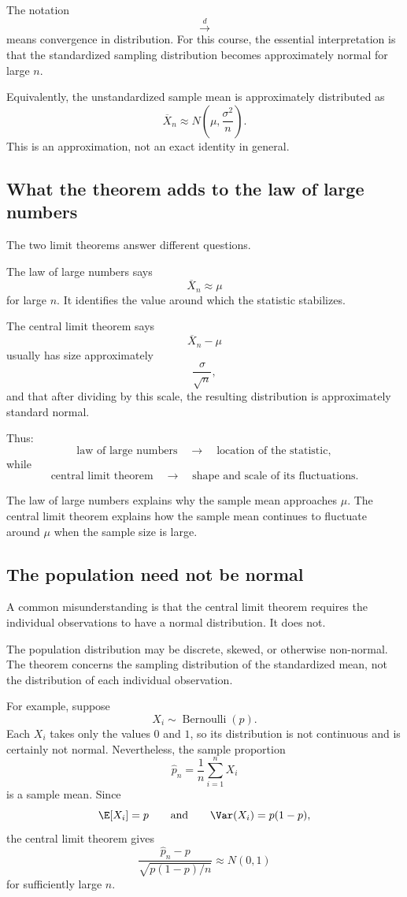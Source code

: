 The notation
\[
\xrightarrow{d}
\]
means convergence in distribution. For this course, the essential interpretation
is that the standardized sampling distribution becomes approximately normal for
large \(n\).

Equivalently, the unstandardized sample mean is approximately distributed as
\[
\overline X_n
\approx
N\left(\mu,\frac{\sigma^2}{n}\right).
\]
This is an approximation, not an exact identity in general.

\subsection*{What the theorem adds to the law of large numbers}

The two limit theorems answer different questions.

The law of large numbers says
\[
\overline X_n\approx\mu
\]
for large \(n\). It identifies the value around which the statistic stabilizes.

The central limit theorem says
\[
\overline X_n-\mu
\]
usually has size approximately
\[
\frac{\sigma}{\sqrt n},
\]
and that after dividing by this scale, the resulting distribution is
approximately standard normal.

Thus:
\[
\text{law of large numbers}
\quad\longrightarrow\quad
\text{location of the statistic},
\]
while
\[
\text{central limit theorem}
\quad\longrightarrow\quad
\text{shape and scale of its fluctuations}.
\]

\begin{summarybox}
The law of large numbers explains why the sample mean approaches \(\mu\). The
central limit theorem explains how the sample mean continues to fluctuate around
\(\mu\) when the sample size is large.
\end{summarybox}

\subsection*{The population need not be normal}

A common misunderstanding is that the central limit theorem requires the
individual observations to have a normal distribution. It does not.

The population distribution may be discrete, skewed, or otherwise non-normal.
The theorem concerns the sampling distribution of the standardized mean, not the
distribution of each individual observation.

For example, suppose
\[
X_i\sim\operatorname{Bernoulli}(p).
\]
Each \(X_i\) takes only the values \(0\) and \(1\), so its distribution is not
continuous and is certainly not normal. Nevertheless, the sample proportion
\[
\widehat p_n=\frac1n\sum_{i=1}^nX_i
\]
is a sample mean. Since
\[
\E[X_i]=p
\qquad\text{and}\qquad
\Var(X_i)=p(1-p),
\]
the central limit theorem gives
\[
\frac{\widehat p_n-p}
{\sqrt{p(1-p)/n}}
\approx N(0,1)
\]
for sufficiently large \(n\).

